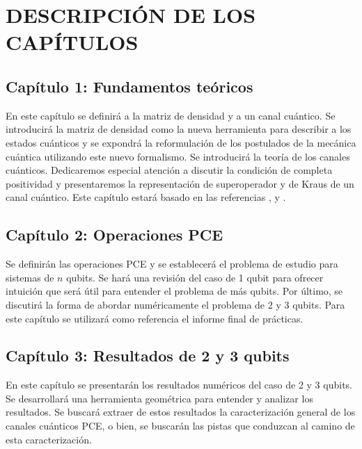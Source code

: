 \chapter{DESCRIPCIÓN DE LOS CAPÍTULOS}

\section*{Capítulo 1: Fundamentos teóricos}
En este capítulo se definirá a la matriz de densidad y a un canal cuántico. 
Se introducirá la matriz de densidad como la nueva herramienta para 
describir a los estados cuánticos y se expondrá la reformulación de 
los postulados de la mecánica cuántica utilizando este nuevo formalismo.
Se introducirá la teoría de los canales cuánticos. Dedicaremos especial 
atención a discutir la condición de completa positividad y presentaremos 
la representación de superoperador y de Kraus de un canal cuántico.
Este capítulo estará basado en las referencias \cite{bengtsson_zyczkowski_2017},
\cite{nielsen_chuang_2011} y \cite{sakurai_napolitano_2017}.

\section*{Capítulo 2: Operaciones PCE}
Se definirán las operaciones PCE y se establecerá el problema de 
estudio para sistemas de $n$ qubits. Se hará una revisión del caso 
de 1 qubit para ofrecer intuición que será útil para entender el 
problema de más qubits. Por último, se discutirá la forma de 
abordar numéricamente el problema de 2 y 3 qubits. Para este
capítulo se utilizará como referencia el informe final de prácticas.

\section*{Capítulo 3: Resultados de 2 y 3 qubits}
En este capítulo se presentarán los resultados numéricos del 
caso de 2 y 3 qubits. Se desarrollará una herramienta geométrica 
para entender y analizar los resultados. Se buscará extraer de 
estos resultados la caracterización general de los canales cuánticos PCE,
o bien, se buscarán las pistas que conduzcan al camino de esta caracterización.

